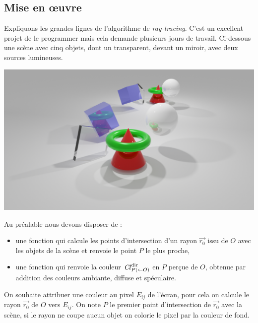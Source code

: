 \documentclass[11pt,class=report,crop=false]{standalone}
\begin{document}


\subsection{Mise en \oe uvre}


Expliquons les grandes lignes de l'algorithme de \emph{ray-tracing}.
C'est un excellent projet de le programmer mais cela demande plusieurs jours de travail.
Ci-dessous une scène avec cinq objets, dont un transparent, devant un miroir, avec deux sources lumineuses.
\begin{center}
	\includegraphics[scale=\myscale,scale=0.30,trim={8cm 5cm 8cm 0cm},clip]{figures/ray-tracing-03}	
\end{center}


Au préalable nous devons disposer de :
\begin{itemize}
	\item une fonction  qui calcule les points d'intersection d'un rayon $\vec{r_0}$ issu de $O$ avec les objets de la scène et renvoie le point $P$ le plus proche,
	\item une fonction  qui renvoie la couleur $\operatorname{\it Cl}^{\text{dir}}_{P(\leftarrow O)}$ en $P$ perçue de $O$, obtenue par addition des couleurs ambiante, diffuse et spéculaire.
\end{itemize}


On souhaite attribuer une couleur au pixel $E_{ij}$ de l'écran,
pour cela on calcule le rayon $\vec{r_0}$ de $O$ vers $E_{ij}$.
On note $P$ le premier point d'intersection de $\vec{r_0}$ avec la scène,
si le rayon ne coupe aucun objet on colorie le pixel par la couleur de fond.
\end{document}
